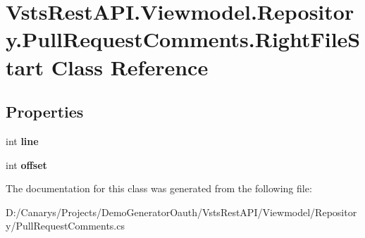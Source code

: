 \hypertarget{class_vsts_rest_a_p_i_1_1_viewmodel_1_1_repository_1_1_pull_request_comments_1_1_right_file_start}{}\section{Vsts\+Rest\+A\+P\+I.\+Viewmodel.\+Repository.\+Pull\+Request\+Comments.\+Right\+File\+Start Class Reference}
\label{class_vsts_rest_a_p_i_1_1_viewmodel_1_1_repository_1_1_pull_request_comments_1_1_right_file_start}
\subsection*{Properties}
\begin{DoxyCompactItemize}
\item 
\mbox{\label{class_vsts_rest_a_p_i_1_1_viewmodel_1_1_repository_1_1_pull_request_comments_1_1_right_file_start_a67b9a761d660b93cfed7a9fb4bffccf4}} 
int {\bfseries line}
\item 
\mbox{\label{class_vsts_rest_a_p_i_1_1_viewmodel_1_1_repository_1_1_pull_request_comments_1_1_right_file_start_a40b8b7578b9f4d45808f45152b81755c}} 
int {\bfseries offset}
\end{DoxyCompactItemize}


The documentation for this class was generated from the following file\+:\begin{DoxyCompactItemize}
\item 
D\+:/\+Canarys/\+Projects/\+Demo\+Generator\+Oauth/\+Vsts\+Rest\+A\+P\+I/\+Viewmodel/\+Repository/Pull\+Request\+Comments.\+cs\end{DoxyCompactItemize}
